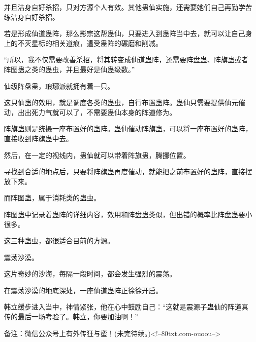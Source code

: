 \begin{this_body}
并且洁身自好杀招，只对方源个人有效。其他蛊仙实施，还需要她们自己再勤学苦练洁身自好杀招。

若是形成仙道蛊阵，那么影宗这帮蛊仙，只要进入到蛊阵当中去，就可以让自己身上的不灭星标的相关道痕，遭受蛊阵的碾磨和削减。

“所以，我不仅需要改善杀招，将其转变成仙道蛊阵，还需要阵盘蛊、阵旗蛊或者阵图蛊之类的蛊虫，并且最好是仙蛊级数。”

仙级阵盘蛊，琅琊派就拥有着一只。

这只仙蛊的效用，就是调度各类的蛊虫，自行布置蛊阵。蛊仙只需要提供仙元催动，出出死力气就可以了，不需要蛊仙本身的阵道修为。

阵旗蛊则是统摄一座布置好的蛊阵。蛊仙催动阵旗蛊，可以将一座布置好的蛊阵，直接收到阵旗蛊中去。

然后，在一定的视线内，蛊仙就可以带着阵旗蛊，腾挪位置。

寻找到合适的地点后，只要将阵旗蛊再度催动，就能把之前布置好的蛊阵，直接摆放下来。

而阵图蛊，属于消耗类的蛊虫。

阵图蛊中记录着蛊阵的详细内容，效用和阵盘蛊类似，但出错的概率比阵盘蛊要小很多。

这三种蛊虫，都很适合目前的方源。

震荡沙漠。

这片奇妙的沙海，每隔一段时间，都会发生强烈的震荡。

在震荡沙漠的地底深处，一座仙道蛊阵正徐徐开启。

韩立缓步进入当中，神情紧张，他在心中鼓励自己：“这就是震源子蛊仙的阵道真传的最后一场考验了。韩立，你要加油啊！”

备注：微信公众号上有外传狂与蛮！(未完待续。)<!--80txt.com-ouoou-->

\end{this_body}

